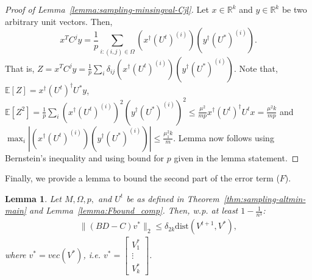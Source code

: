\documentclass[11pt]{article}
\theoremstyle{plain}
\newtheorem{lemma}[theorem]{Lemma}
\theoremstyle{definition}
\newcommand{\dist}{\mathrm{dist}}
\newcommand{\E}{\mathbb{E}}
\newcommand{\Vt}{V^{t+1}}
\newcommand{\Ut}{U^{t}}
\newcommand{\Vo}{V^*}
\newcommand{\Uo}{U^*}
\begin{document}
\begin{proof}[Proof of Lemma~\ref{lemma:sampling-minsingval-Cjl}]
Let $x\in \mathbb{R}^{k}$ and $y\in \mathbb{R}^k$ be two arbitrary unit vectors. Then, 
$$x^TC^jy=\frac{1}{p}\sum_{i:(i,j)\in \Omega}(x^\dag(\Ut)^{(i)})(y^\dag(\Uo)^{(i)}).$$
That is, $Z=x^TC^jy=\frac{1}{p}\sum_{i}\delta_{ij}(x^\dag(\Ut)^{(i)})(y^\dag(\Uo)^{(i)})$. Note that, $\E[Z]=x^\dag (\Ut)^\dag\Uo y$, $\E[Z^2]=\frac{1}{p}\sum_{i}(x^\dag(\Ut)^{(i)})^2(y^\dag(\Uo)^{(i)})^2\leq \frac{\mu^2}{mp}x^\dag(\Ut)^\dag\Ut x=\frac{\mu^2k}{mp}$ and $\max_i |(x^\dag(\Ut)^{(i)})(y^\dag(\Uo)^{(i)})|\leq \frac{\mu_1^2k}{m}$. Lemma now follows using Bernstein's inequality and using bound for $p$ given in the lemma statement. 
\end{proof}
Finally, we provide a lemma to bound the second part of the error term ($F$).
\begin{lemma}\label{lemma:sampling-minsingval-Cl}
Let $M, \Omega, p,$ and $\Ut$ be as defined in Theorem~\ref{thm:sampling-altmin-main} and Lemma~\ref{lemma:Fbound_comp}.
Then, w.p. at least $1-\frac{1}{n^3}$: 
\begin{align}\label{eqn:sampling-minsingval-Cl}
\|(BD-C)v^*\|_2\leq  \delta_{2k} \dist(\Vt, \Vo),
\end{align}
where $v^*=vec(\Vo)$, i.e. $v^*=\left[\begin{matrix}\Vo_1\\ \vdots \\ \Vo_k\end{matrix}\right]$. 
\end{lemma}
\end{document}
